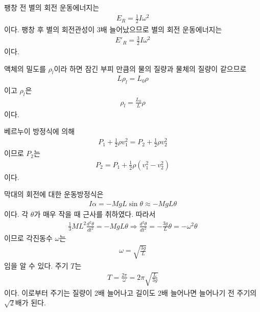 \documentclass[floatfix,nofootinbib,superscriptaddress,fleqn]{revtex4-2}
\begin{document}
 

\vspace{0.5cm} 

팽창 전 별의 회전 운동에너지는
\begin{align}
  E_R = \frac{1}{2}I\omega^2
\end{align}
이다. 팽창 후 별의 회전관성이 3배 늘어났으므로 별의 회전 운동에너지는
\begin{align}
  E'_R=\frac{3}{2}I\omega^2
\end{align}
이다.

 

\vspace{0.5cm} 
액체의 밀도를 $\rho_l$이라 하면 잠긴 부피 만큼의 물의 질량과
물체의 질량이 같으므로
\begin{align}
  L \rho_l = L_0 \rho
\end{align}
이고 $\rho_l$은
\begin{align}
  \rho_l = \frac{L_0}{L}\rho
\end{align}
이다.
\vspace{0.5cm}
 


베르누이 방정식에 의해
\begin{align}
  P_1 + \frac{1}{2}\rho v_1^2
  =  P_2 + \frac{1}{2}\rho v_2^2
\end{align}
이므로 $P_2$는
\begin{align}
  P_2 = P_1 + \frac{1}{2}\rho\left(v_1^2-v_2^2\right)
\end{align}
이다.

 

\vspace{0.5cm} 
막대의 회전에 대한 운동방정식은
\begin{align}
  I\alpha = -MgL\sin\theta \approx -MgL\theta
\end{align}
이다. 각 $\theta$가 매우 작을 때 근사를 취하였다. 따라서
\begin{align}
  \frac{1}{3}ML^2 \frac{d^2\theta}{dt^2} = -MgL\theta \Longrightarrow
  \frac{d^2\theta}{dt^2} = -\frac{3g}{L}\theta = -\omega^2\theta
\end{align}
이므로 각진동수 $\omega$는
\begin{align}
  \omega = \sqrt{\frac{3g}{L}}
\end{align}
임을 알 수 있다. 주기 $T$는
\begin{align}
  T = \frac{2\pi}{\omega} =2\pi\sqrt{\frac{L}{3g}}
\end{align}
이다. 이로부터 주기는 질량이 2배 늘어나고 길이도 2배 늘어나면 늘어나기 전 주기의
$\sqrt{2}$배가 된다.
\vspace{0.5cm}
 
\end{document}
